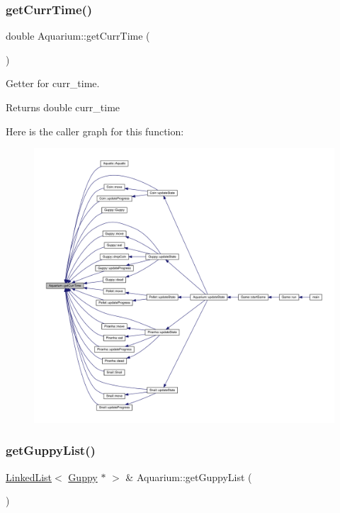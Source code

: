 \subsubsection{\texorpdfstring{get\+Curr\+Time()}{getCurrTime()}}
{\footnotesize\ttfamily double Aquarium\+::get\+Curr\+Time (\begin{DoxyParamCaption}{ }\end{DoxyParamCaption})}



Getter for curr\+\_\+time. 

\begin{DoxyReturn}{Returns}
double curr\+\_\+time 
\end{DoxyReturn}
Here is the caller graph for this function\+:\nopagebreak
\begin{figure}[H]
\begin{center}
\leavevmode
\includegraphics[width=350pt]{class_aquarium_aae7158daf192a78ffaf165285386221f_icgraph}
\end{center}
\end{figure}
\mbox{\label{class_aquarium_a3244b33f404c2887f04342754f17f4ee}} 
\subsubsection{\texorpdfstring{get\+Guppy\+List()}{getGuppyList()}}
{\footnotesize\ttfamily \mbox{\hyperlink{class_linked_list}{Linked\+List}}$<$ \mbox{\hyperlink{class_guppy}{Guppy}} $\ast$ $>$ \& Aquarium\+::get\+Guppy\+List (\begin{DoxyParamCaption}{ }\end{DoxyParamCaption})}



